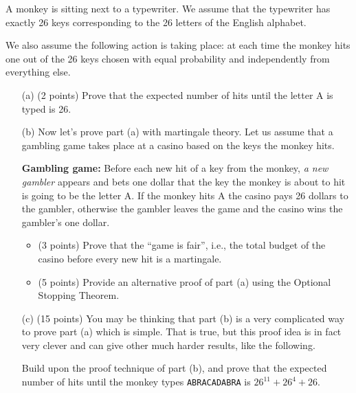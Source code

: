 \documentclass{article}
\begin{document}
A monkey is sitting next to a typewriter. We assume that the typewriter has exactly 26 keys corresponding to the 26 letters of the English alphabet.

We also assume the following action is taking place: at each time the monkey hits one out of the 26 keys chosen with equal probability and independently from everything else.

\begin{enumerate}
    \item[(a)] (2 points) Prove that the expected number of hits until the letter A is typed is 26.
    
    \item[(b)] Now let’s prove part (a) with martingale theory. Let us assume that a gambling game takes place at a casino based on the keys the monkey hits.
    
    \textbf{Gambling game:} Before each new hit of a key from the monkey, \textit{a new gambler} appears and bets one dollar that the key the monkey is about to hit is going to be the letter A. If the monkey hits A the casino pays 26 dollars to the gambler, otherwise the gambler leaves the game and the casino wins the gambler’s one dollar.
    \begin{itemize}
        \item (3 points) Prove that the ``game is fair'', i.e., the total budget of the casino before every new hit is a martingale.
        \item (5 points) Provide an alternative proof of part (a) using the Optional Stopping Theorem.
    \end{itemize}
    
    \item[(c)] (15 points) You may be thinking that part (b) is a very complicated way to prove part (a) which is simple. That is true, but this proof idea is in fact very clever and can give other much harder results, like the following.

    Build upon the proof technique of part (b), and prove that the expected number of hits until the monkey types \texttt{ABRACADABRA} is $26^{11} + 26^4 + 26$.
\end{enumerate}
\end{document}
